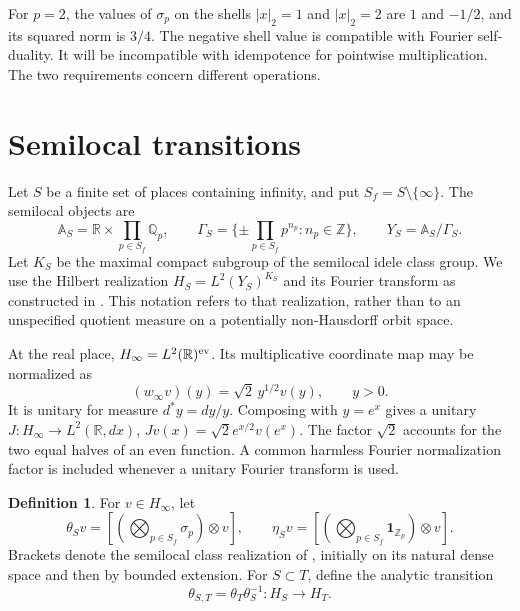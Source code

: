 \documentclass[11pt,letterpaper]{article}
\theoremstyle{definition}
\newtheorem{definition}[theorem]{Definition}
\theoremstyle{remark}
\newcommand{\R}{\mathbb R}
\newcommand{\Q}{\mathbb Q}
\newcommand{\Z}{\mathbb Z}
\newcommand{\ind}{\mathbf1}
\begin{document}
For $p=2$, the values of $\sigma_p$ on the shells $|x|_2=1$ and
$|x|_2=2$ are $1$ and $-1/2$, and its squared norm is $3/4$.
The negative shell value is compatible with Fourier self-duality.
It will be incompatible with idempotence for pointwise multiplication.
The two requirements concern different operations.

\section{Semilocal transitions}

Let $S$ be a finite set of places containing infinity, and put
$S_f=S\setminus\{\infty\}$. The semilocal objects are
\begin{equation}\label{eq:semilocal-objects}
 \mathbb A_S=\R\times\prod_{p\in S_f}\Q_p,
 \qquad \Gamma_S=\{\pm\prod_{p\in S_f}p^{n_p}:n_p\in\Z\},
 \qquad Y_S=\mathbb A_S/\Gamma_S.
\end{equation}
Let $K_S$ be the maximal compact subgroup of the semilocal idele class
group. We use the Hilbert realization
$H_S=L^2(Y_S)^{K_S}$ and its Fourier transform as constructed in
\cite[Section 4.1]{CCM}. This notation refers to that realization,
rather than to an unspecified quotient measure on a potentially
non-Hausdorff orbit space.

At the real place, $H_\infty=L^2(\R)^{\rm ev}$. Its multiplicative
coordinate map may be normalized as
\begin{equation}\label{eq:w-infinity}
 (w_\infty v)(y)=\sqrt2\,y^{1/2}v(y),\qquad y>0.
\end{equation}
It is unitary for measure $d^*y=dy/y$. Composing with $y=e^x$ gives
a unitary $J:H_\infty\to L^2(\R,dx)$,
$Jv(x)=\sqrt2e^{x/2}v(e^x)$. The factor $\sqrt2$ accounts for the
two equal halves of an even function. A common harmless Fourier
normalization factor is included whenever a unitary Fourier transform
is used.

\begin{definition}\label{def:local-correspondence:theta}
For $v\in H_\infty$, let
\begin{equation}\label{eq:theta-eta}
 \theta_Sv=[(\bigotimes_{p\in S_f}\sigma_p)\otimes v],\qquad
 \eta_Sv=[(\bigotimes_{p\in S_f}\ind_{\Z_p})\otimes v].
\end{equation}
Brackets denote the semilocal class realization of \cite{CCM}, initially
on its natural dense space and then by bounded extension. For
$S\subset T$, define the analytic transition
\begin{equation}\label{eq:relative-theta}
 \theta_{S,T}=\theta_T\theta_S^{-1}:H_S\longrightarrow H_T.
\end{equation}
\end{definition}
\end{document}
